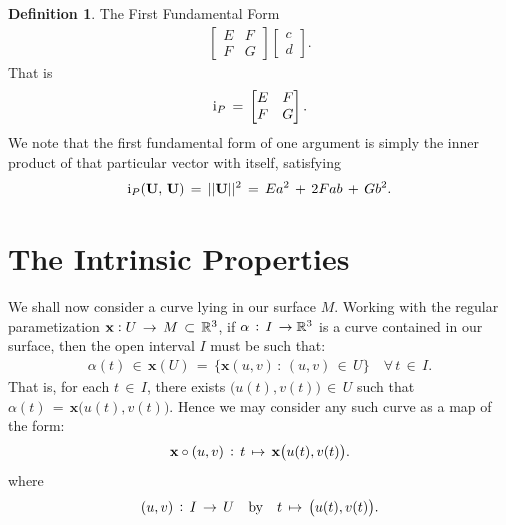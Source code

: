 \documentclass{UKZNcomp}
\newcommand{\vect}[1]{\mathbf{#1}} %
\newcommand{\RN}[1]{%
  \textup{\uppercase\expandafter{\romannumeral#1}}%
}
\theoremstyle{definition}
\newtheorem{definition}{Definition}[section]
\theoremstyle{remark}
\begin{document}
\begin{definition}{The First Fundamental Form}
\begin{align*}
\begin{bmatrix}
    E & F\\
    F & G
\end{bmatrix}
\begin{bmatrix}
    c\\
    d
\end{bmatrix}.
\end{align*}
That is
\begin{align*}
\RN{1}_P \, = \,
\begin{bmatrix}
    E & F\\
    F & G
\end{bmatrix}.
\end{align*}
We note that the first fundamental form of one argument is simply the inner product of that particular vector with itself, satisfying
\begin{align*}
\RN{1}_P(\vect{U},\,\vect{U}) \, = \, \lvert\lvert\vect{U}\rvert\rvert^2 \, = \, Ea^2 \, +\, 2Fab \, +\, Gb^2.
\end{align*}
\end{definition}

\section{The Intrinsic Properties}
We shall now consider a curve lying in our surface $M$. Working with the regular parametization $\vect{x} \vcentcolon U \, \to \, M \, \subset \, \mathbb{R}^{3}$, if $\alpha \, \vcentcolon \, I \, \to \mathbb{R}^{3}$ is a curve contained in our surface, then the open interval $I$ must be such that:
\begin{align*}
\alpha(t) \, \in \, \vect{x}(U) \, = \, \{\vect{x}(u,v) \, : \, (u,v)\, \in \, U\} \quad \forall \, t \, \in \, I.
\end{align*}
That is, for each $t \, \in \, I$, there exists $\big(u(t),v(t)\big) \, \in \, U$ such that $\alpha(t) \, = \, \vect{x}\big(u(t),v(t)\big)$. Hence we may consider any such curve as a map of the form:
\begin{align*}
\vect{x} \circ (u,v) \, \vcentcolon \, t \, \mapsto \, \vect{x}\big(u(t),v(t)\big).
\end{align*}
where
\begin{align*}
(u,v) \, \vcentcolon \, I \, \to \, U \quad \text{by} \quad t \, \mapsto \, \big(u(t),v(t)\big).
\end{align*}
\end{document}

